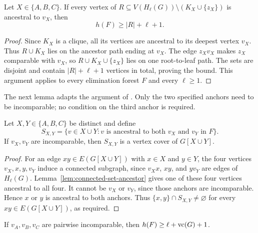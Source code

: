 \begin{lemma}
\label{lem:anchor-path}
Let $X\in\{A,B,C\}$. If every vertex of
$R\subseteq V(H_\ell(G))\setminus(K_X\cup\{z_X\})$ is ancestral
to $v_X$, then
\begin{equation}\label{eq:anchor-path-bound}
 h(F)\ge |R|+\ell+1.
\end{equation}
\end{lemma}

\begin{proof}
Since $K_X$ is a clique, all its vertices are ancestral to its deepest
vertex $v_X$. Thus $R\cup K_X$ lies on the ancestor path ending at
$v_X$. The edge $z_Xv_X$ makes $z_X$ comparable with $v_X$, so
$R\cup K_X\cup\{z_X\}$ lies on one root-to-leaf path. The sets
are disjoint and contain $|R|+\ell+1$ vertices in total, proving
the bound. This argument applies to every elimination forest $F$
and every $\ell\ge1$.
\end{proof}

The next lemma adapts the argument of
\cite[Claim~9 in the proof of Lemma~6]{BNS}. Only the two specified anchors need to be
incomparable; no condition on the third anchor is required.

\begin{lemma}
\label{lem:anchor-pair-cover}
Let $X,Y\in\{A,B,C\}$ be distinct and define
\[
 S_{X,Y}=\{v\in X\cup Y:v\text{ is ancestral to both }v_X
                                      \text{ and }v_Y\text{ in }F\}.
\]
If $v_X,v_Y$ are incomparable, then $S_{X,Y}$ is a vertex cover
of $G[X\cup Y]$.
\end{lemma}

\begin{proof}
For an edge $xy\in E(G[X\cup Y])$ with $x\in X$ and $y\in Y$,
the four vertices $v_X,x,y,v_Y$ induce a connected subgraph, since
$v_Xx$, $xy$, and $yv_Y$ are edges of $H_\ell(G)$.
Lemma~\ref{lem:connected-set-ancestor} gives one of these four
vertices ancestral to all four. It cannot
be $v_X$ or $v_Y$, since those anchors are incomparable. Hence $x$
or $y$ is ancestral to both anchors. Thus
$\{x,y\}\cap S_{X,Y}\ne\varnothing$ for every
$xy\in E(G[X\cup Y])$, as required.
\end{proof}

\begin{lemma}\label{lem:incomparable-anchor-extension}
If $v_A,v_B,v_C$ are pairwise incomparable, then
$h(F)\ge\ell+\operatorname{vc}(G)+1$.
\end{lemma}

